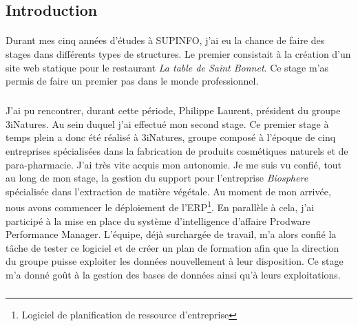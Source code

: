 \documentclass[11pt, a4paper ]{article}
\let\stdsection\section
\renewcommand\section{\newpage\stdsection}
\begin{document}
\begin{spacing}{1.5}
	\section{Introduction} %

\paragraph{}
Durant mes cinq années d'études à SUPINFO, j'ai eu la chance de faire des stages dans différents types de structures. Le premier consistait à la création d'un site web statique pour le restaurant \emph{La table de Saint Bonnet}. Ce stage m'as permis de faire un premier pas dans le monde professionnel. 
\subparagraph{}
J'ai pu rencontrer, durant cette période, Philippe Laurent, président du groupe 3iNatures. Au sein duquel j'ai effectué mon second stage. Ce premier stage à temps plein a donc été réalisé à 3iNatures, groupe composé à l'époque de cinq entreprises spécialisées dans la fabrication de produits cosmétiques naturels et de para-pharmacie. J'ai très vite acquis mon autonomie. Je me suis vu confié, tout au long de mon stage, la gestion du support pour l'entreprise \emph{Biosphere} spécialisée dans l'extraction de matière végétale. Au moment de mon arrivée, nous avons commencer le déploiement de l'ERP\footnote{Logiciel de planification de ressource d'entreprise}. En parallèle à cela, j'ai participé à la mise en place du système d'intelligence d'affaire Prodware Performance Manager. L'équipe, déjà surchargée de travail, m'a alors confié la tâche de tester ce logiciel et de créer un plan de formation afin que la direction du groupe puisse exploiter les données nouvellement à leur disposition. Ce stage m'a donné goût à la gestion des bases de données ainsi qu'à leurs exploitations.
\subparagraph{}

\end{spacing}
\end{document}
